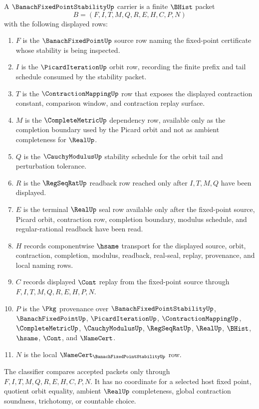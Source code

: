 \begin{definition}
\label{def:banach-fixed-point-stability-carrier}
A $\BanachFixedPointStabilityUp$ carrier is a finite $\BHist$ packet
$$
B=(F,I,T,M,Q,R,E,H,C,P,N)
$$
with the following displayed rows:
\begin{enumerate}
\item $F$ is the $\BanachFixedPointUp$ source row naming the fixed-point certificate whose stability is being inspected.
\item $I$ is the $\PicardIterationUp$ orbit row, recording the finite prefix and tail schedule consumed by the stability packet.
\item $T$ is the $\ContractionMappingUp$ row that exposes the displayed contraction constant, comparison window, and contraction replay surface.
\item $M$ is the $\CompleteMetricUp$ dependency row, available only as the completion boundary used by the Picard orbit and not as ambient completeness for $\RealUp$.
\item $Q$ is the $\CauchyModulusUp$ stability schedule for the orbit tail and perturbation tolerance.
\item $R$ is the $\RegSeqRatUp$ readback row reached only after $I,T,M,Q$ have been displayed.
\item $E$ is the terminal $\RealUp$ seal row available only after the fixed-point source, Picard orbit, contraction row, completion boundary, modulus schedule, and regular-rational readback have been read.
\item $H$ records componentwise $\hsame$ transport for the displayed source, orbit, contraction, completion, modulus, readback, real-seal, replay, provenance, and local naming rows.
\item $C$ records displayed $\Cont$ replay from the fixed-point source through $F,I,T,M,Q,R,E,H,P,N$.
\item $P$ is the $\Pkg$ provenance over $\BanachFixedPointStabilityUp$, $\BanachFixedPointUp$, $\PicardIterationUp$, $\ContractionMappingUp$, $\CompleteMetricUp$, $\CauchyModulusUp$, $\RegSeqRatUp$, $\RealUp$, $\BHist$, $\hsame$, $\Cont$, and $\NameCert$.
\item $N$ is the local $\NameCert_{\BanachFixedPointStabilityUp}$ row.
\end{enumerate}
The classifier compares accepted packets only through $F,I,T,M,Q,R,E,H,C,P,N$. It has no coordinate for a selected host fixed point, quotient orbit equality, ambient $\RealUp$ completeness, global contraction soundness, trichotomy, or countable choice.
\end{definition}


